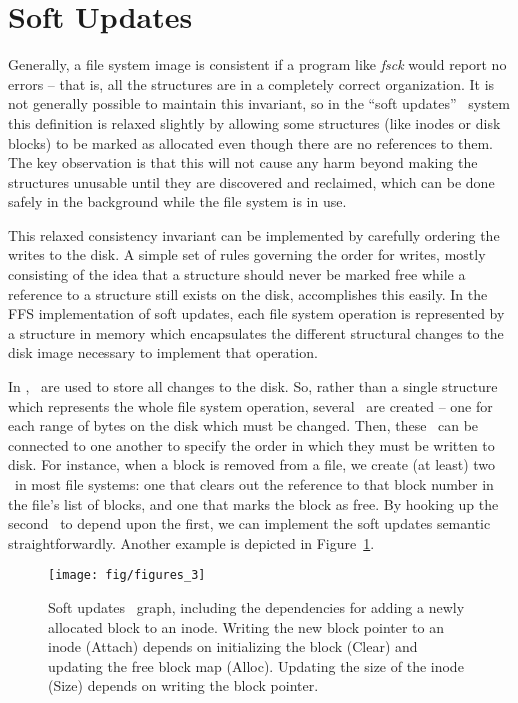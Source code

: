\section {Soft Updates}
\label{sec:softupdate}

Generally, a file system image is consistent if a program like \emph{fsck}
would report no errors -- that is, all the structures are in a completely
correct organization. It is not generally possible to maintain this invariant,
so in the ``soft updates''~\cite{ganger00soft} system this definition is
relaxed slightly by allowing some structures (like inodes or disk blocks) to be
marked as allocated even though there are no references to them. The key
observation is that this will not cause any harm beyond making the structures
unusable until they are discovered and reclaimed, which can be done safely in
the background while the file system is in use.

This relaxed consistency invariant can be implemented by carefully ordering the
writes to the disk. A simple set of rules governing the order for writes,
mostly consisting of the idea that a structure should never be marked free
while a reference to a structure still exists on the disk, accomplishes this
easily. In the FFS implementation of soft updates, each file system operation
is represented by a structure in memory which encapsulates the different
structural changes to the disk image necessary to implement that operation.

In \Kudos, \chdescs\ are used to store all changes to the disk. So, rather than
a single structure which represents the whole file system operation, several
\chdescs\ are created -- one for each range of bytes on the disk which must be
changed. Then, these \chdescs\ can be connected to one another to specify the
order in which they must be written to disk. For instance, when a block is
removed from a file, we create (at least) two \chdescs\ in most file systems:
one that clears out the reference to that block number in the file's list of
blocks, and one that marks the block as free. By hooking up the second \chdesc\
to depend upon the first, we can implement the soft updates semantic
straightforwardly. Another example is depicted in Figure~\ref{fig:softupdate}.

\begin{figure}[htb]
  \centering
  \texttt{[image: fig/figures\_3]}
  \caption{\label{fig:softupdate} Soft updates \chdesc\ graph,
  including the dependencies for adding a newly allocated block to an
  inode. Writing the new block pointer to an inode (Attach) depends on
  initializing the block (Clear) and updating the free block map (Alloc).
  Updating the size of the inode (Size) depends on writing the block
  pointer.}
\end{figure}

